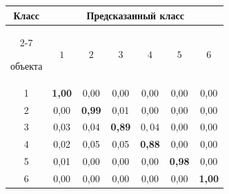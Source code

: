 \begin{table}\small %


\begin{minipage}[t]{80mm}


\begin{center}




\vspace*{2ex}





\tabcolsep=6.4pt


\begin{tabular}{|c|c|c|c|c|c|c|}


\hline


Класс & \multicolumn{6}{c|}{Предсказанный класс} \\ 


  \cline{2-7}


объекта & $1$ & $2$ & $3$ & $4$ & $5$ & $6$\\ 


\hline


 1 & \textbf{1,00} & 0,00 & 0,00 & 0,00 & 0,00 & 0,00\\ 


 2 & 0,00 & \textbf{0,99} & 0,01 & 0,00 & 0,00 & 0,00\\ 


 3 & 0,03 & 0,04 & \textbf{0,89} & $0,04$ & 0,00 & 0,00\\ 


 4 & 0,02 & 0,05 & 0,05 & \textbf{0,88} & 0,00 & 0,00\\ 


 5 & 0,01 & 0,00 & 0,00 & 0,00 & \textbf{0,98} & 0,00\\ 


 6 & 0,00 & 0,00 & 0,00 & 0,00 & 0,00 & \textbf{1,00}\\ 


 \hline


\end{tabular}


\end{center}




\end{minipage}



\end{table}

